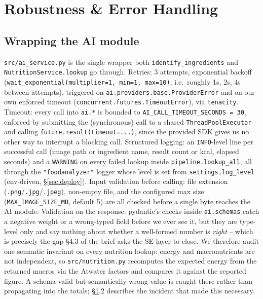 \documentclass[11pt,a4paper]{article}
\begin{document}
\section{Robustness \& Error Handling}\label{sec:robustness}

\subsection{Wrapping the AI module}

\texttt{src/ai\_service.py} is the single wrapper both \texttt{identify\_ingredients} and \texttt{NutritionService.lookup} go through. Retries: 3 attempts, exponential backoff (\texttt{wait\_exponential(multiplier=1, min=1, max=10)}, i.e.\ roughly 1s, 2s, 4s between attempts), triggered on \texttt{ai.providers.base.ProviderError} and on our own enforced timeout (\texttt{concurrent.futures.TimeoutError}), via \texttt{tenacity}. Timeout: every call into \texttt{ai.*} is bounded to \texttt{AI\_CALL\_TIMEOUT\_SECONDS = 30}, enforced by submitting the (synchronous) call to a shared \texttt{ThreadPoolExecutor} and calling \texttt{future.result(timeout=...)}, since the provided SDK gives us no other way to interrupt a blocking call. Structured logging: an \texttt{INFO}-level line per successful call (image path or ingredient name, result count or kcal, elapsed seconds) and a \texttt{WARNING} on every failed lookup inside \texttt{pipeline.lookup\_all}, all through the \texttt{"foodanalyzer"} logger whose level is set from \texttt{settings.log\_level} (env-driven, \S\ref{sec:deploy}). Input validation before calling: file extension (\texttt{.png}/\texttt{.jpg}/\texttt{.jpeg}), non-empty file, and the configured max size (\texttt{MAX\_IMAGE\_SIZE\_MB}, default 5) are all checked before a single byte reaches the AI module. Validation on the response: pydantic's checks inside \texttt{ai.schemas} catch a negative weight or a wrong-typed field before we ever see it, but they are type-level only and say nothing about whether a well-formed number is \emph{right} -- which is precisely the gap \S4.3 of the brief asks the SE layer to close. We therefore audit one semantic invariant on every nutrition lookup: energy and macronutrients are not independent, so \texttt{src/nutrition.py} recomputes the expected energy from the returned macros via the Atwater factors and compares it against the reported figure. A schema-valid but semantically wrong value is caught there rather than propagating into the totals; \S\ref{sec:robustness}.2 describes the incident that made this necessary.
\end{document}
